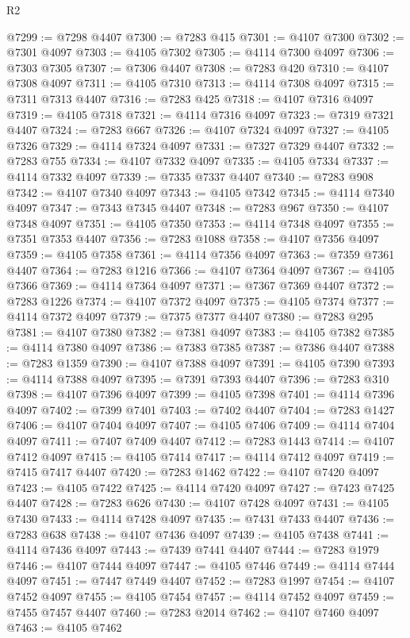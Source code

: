 \begin{lexlean}{R2}
\begin{coremodule}
@7299 := @7298 @4407
@7300 := @7283 @415
@7301 := @4107 @7300
@7302 := @7301 @4097
@7303 := @4105 @7302
@7305 := @4114 @7300 @4097
@7306 := @7303 @7305
@7307 := @7306 @4407
@7308 := @7283 @420
@7310 := @4107 @7308 @4097
@7311 := @4105 @7310
@7313 := @4114 @7308 @4097
@7315 := @7311 @7313 @4407
@7316 := @7283 @425
@7318 := @4107 @7316 @4097
@7319 := @4105 @7318
@7321 := @4114 @7316 @4097
@7323 := @7319 @7321 @4407
@7324 := @7283 @667
@7326 := @4107 @7324 @4097
@7327 := @4105 @7326
@7329 := @4114 @7324 @4097
@7331 := @7327 @7329 @4407
@7332 := @7283 @755
@7334 := @4107 @7332 @4097
@7335 := @4105 @7334
@7337 := @4114 @7332 @4097
@7339 := @7335 @7337 @4407
@7340 := @7283 @908
@7342 := @4107 @7340 @4097
@7343 := @4105 @7342
@7345 := @4114 @7340 @4097
@7347 := @7343 @7345 @4407
@7348 := @7283 @967
@7350 := @4107 @7348 @4097
@7351 := @4105 @7350
@7353 := @4114 @7348 @4097
@7355 := @7351 @7353 @4407
@7356 := @7283 @1088
@7358 := @4107 @7356 @4097
@7359 := @4105 @7358
@7361 := @4114 @7356 @4097
@7363 := @7359 @7361 @4407
@7364 := @7283 @1216
@7366 := @4107 @7364 @4097
@7367 := @4105 @7366
@7369 := @4114 @7364 @4097
@7371 := @7367 @7369 @4407
@7372 := @7283 @1226
@7374 := @4107 @7372 @4097
@7375 := @4105 @7374
@7377 := @4114 @7372 @4097
@7379 := @7375 @7377 @4407
@7380 := @7283 @295
@7381 := @4107 @7380
@7382 := @7381 @4097
@7383 := @4105 @7382
@7385 := @4114 @7380 @4097
@7386 := @7383 @7385
@7387 := @7386 @4407
@7388 := @7283 @1359
@7390 := @4107 @7388 @4097
@7391 := @4105 @7390
@7393 := @4114 @7388 @4097
@7395 := @7391 @7393 @4407
@7396 := @7283 @310
@7398 := @4107 @7396 @4097
@7399 := @4105 @7398
@7401 := @4114 @7396 @4097
@7402 := @7399 @7401
@7403 := @7402 @4407
@7404 := @7283 @1427
@7406 := @4107 @7404 @4097
@7407 := @4105 @7406
@7409 := @4114 @7404 @4097
@7411 := @7407 @7409 @4407
@7412 := @7283 @1443
@7414 := @4107 @7412 @4097
@7415 := @4105 @7414
@7417 := @4114 @7412 @4097
@7419 := @7415 @7417 @4407
@7420 := @7283 @1462
@7422 := @4107 @7420 @4097
@7423 := @4105 @7422
@7425 := @4114 @7420 @4097
@7427 := @7423 @7425 @4407
@7428 := @7283 @626
@7430 := @4107 @7428 @4097
@7431 := @4105 @7430
@7433 := @4114 @7428 @4097
@7435 := @7431 @7433 @4407
@7436 := @7283 @638
@7438 := @4107 @7436 @4097
@7439 := @4105 @7438
@7441 := @4114 @7436 @4097
@7443 := @7439 @7441 @4407
@7444 := @7283 @1979
@7446 := @4107 @7444 @4097
@7447 := @4105 @7446
@7449 := @4114 @7444 @4097
@7451 := @7447 @7449 @4407
@7452 := @7283 @1997
@7454 := @4107 @7452 @4097
@7455 := @4105 @7454
@7457 := @4114 @7452 @4097
@7459 := @7455 @7457 @4407
@7460 := @7283 @2014
@7462 := @4107 @7460 @4097
@7463 := @4105 @7462

\end{coremodule}
\end{lexlean}

